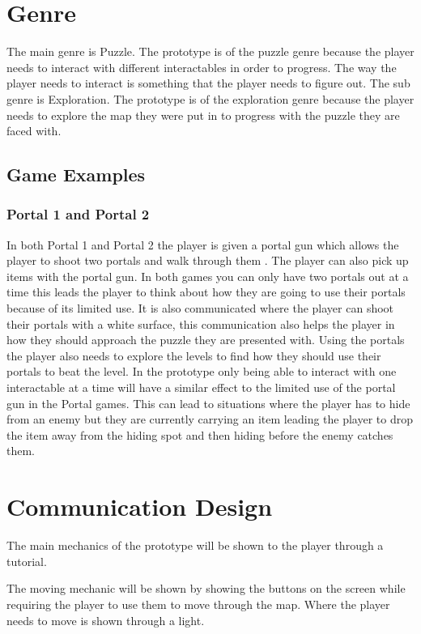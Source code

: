 \documentclass{article}
\begin{document}
\section{Genre}
The main genre is Puzzle. The prototype is of the puzzle genre because the player needs to 
interact with different interactables in order to progress. The way the player
needs to interact is something that the player needs to figure out.
The sub genre is Exploration. The prototype is of the exploration genre because the player needs
to explore the map they were put in to progress with the puzzle they are faced with.
\subsection{Game Examples}
\subsubsection*{Portal 1 and Portal 2}
In both Portal 1 and Portal 2 the player is given a portal gun which allows the player
to shoot two portals and walk through them . The player can also pick up items with
the portal gun. In both games you can only have two portals out at a time this leads
the player to think about how they are going to use their portals because of its limited use.
It is also communicated where the player can shoot their portals with a white surface,
this communication also helps the player in how they should approach the puzzle they
are presented with. Using the portals the player also needs to explore the levels
to find how they should use their portals to beat the level.
In the prototype only being able to interact with one interactable at a time will have a 
similar effect to the limited use of the portal gun in the Portal games. This can lead to 
situations where the player has to hide from an enemy but they are currently carrying
an item leading the player to drop the item away from the hiding spot and then hiding
before the enemy catches them.


\section{Communication Design}
The main mechanics of the prototype will be shown to the player through a tutorial.

The moving mechanic will be shown by showing the buttons on the screen while requiring
the player to use them to move through the map. Where the player needs to move is shown
through a light.
\end{document}
